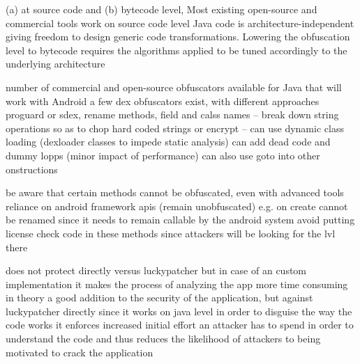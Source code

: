 (a) at source code and (b) bytecode level, Most existing open-source and commercial tools work on source code level\cite{kovachevaMaster}
Java code is architecture-independent giving freedom to design generic code transformations. Lowering the obfuscation level to bytecode requires the algorithms applied to be tuned accordingly to the underlying architecture\cite{kovachevaMaster}

number of commercial and open-source obfuscators available for Java that will work with Android\cite{developersSecuring}
a few dex obfuscators exist, with different approaches\cite{andevconDalvikART}
proguard or sdex, rename methods, field and calss names -- break down string operations so as to chop hard coded strings or encrypt -- can use dynamic class loading (dexloader classes to impede static analysis)\cite{andevconDalvikART}
can add dead code and dummy lopps (minor impact of performance)\cite{andevconDalvikART}
can also use goto into other onstructions\cite{andevconDalvikART}


be aware that certain methods cannot be obfuscated, even with advanced tools\cite{developersSecuring}
reliance on android framework apis (remain unobfuscated)
e.g. on create cannot be renamed since it needs to remain callable by the android system\cite{developersSecuring}
avoid putting license check code in these methods since attackers will be looking for the lvl there\cite{developersSecuring}


does not protect directly versus luckypatcher but in case of an custom implementation it makes the process of analyzing the app more time consuming
in theory a good addition to the security of the application, but against luckypatcher directly since it works on java level in order to disguise the way the code works
it enforces increased initial effort an attacker has to spend in order to understand the code and thus reduces the likelihood of attackers to being motivated to crack the application
